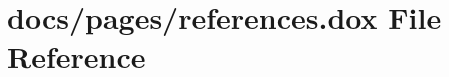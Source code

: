 \hypertarget{references_8dox}{\section{docs/pages/references.dox File Reference}
\label{references_8dox}
}
